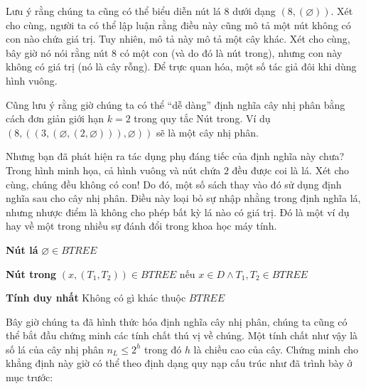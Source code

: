 Lưu ý rằng chúng ta cũng có thể biểu diễn nút lá $8$ dưới dạng $(8, (\varnothing))$. Xét cho cùng, người ta có thể lập luận rằng điều này cũng mô tả một nút không có con nào chứa giá trị. Tuy nhiên, mô tả này mô tả một cây khác. Xét cho cùng, bây giờ nó nói rằng nút $8$ có một con (và do đó là nút trong), nhưng con này không có giá trị (nó là cây rỗng). Để trực quan hóa, một số tác giả đôi khi dùng hình vuông.

Cũng lưu ý rằng giờ chúng ta có thể ``dễ dàng'' định nghĩa cây nhị phân bằng cách đơn giản giới hạn $k = 2$ trong quy tắc Nút trong. Ví dụ $(8, ((3, (\varnothing, (2, \varnothing))), \varnothing))$ sẽ là một cây nhị phân.

Nhưng bạn đã phát hiện ra tác dụng phụ đáng tiếc của định nghĩa này chưa? Trong hình minh họa, cả hình vuông và nút chứa $2$ đều được coi là lá. Xét cho cùng, chúng đều không có con! Do đó, một số sách thay vào đó sử dụng định nghĩa sau cho cây nhị phân. Điều này loại bỏ sự nhập nhằng trong định nghĩa lá, nhưng nhược điểm là không cho phép bất kỳ lá nào có giá trị. Đó là một ví dụ hay về một trong nhiều sự đánh đổi trong khoa học máy tính.

\medskip
\noindent\textbf{Nút lá} $\varnothing \in BTREE$

\noindent\textbf{Nút trong} $(x, (T_1, T_2)) \in BTREE$ nếu $x \in D \land T_1, T_2 \in BTREE$

\noindent\textbf{Tính duy nhất} Không có gì khác thuộc $BTREE$

\medskip
Bây giờ chúng ta đã hình thức hóa định nghĩa cây nhị phân, chúng ta cũng có thể bắt đầu chứng minh các tính chất thú vị về chúng. Một tính chất như vậy là số lá của cây nhị phân $n_L \leq 2^h$ trong đó $h$ là chiều cao của cây. Chứng minh cho khẳng định này giờ có thể theo định dạng quy nạp cấu trúc như đã trình bày ở mục trước:


